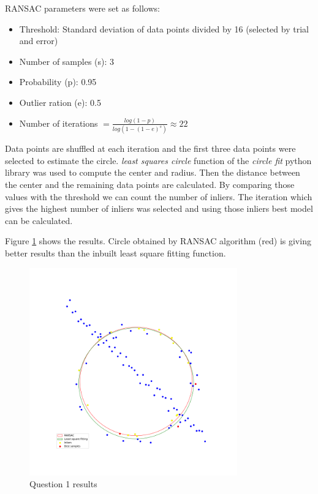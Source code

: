 \documentclass[11pt]{article}
\begin{document}
\noindent RANSAC parameters were set as follows:
\begin{itemize}
    \item Threshold: Standard deviation of data points divided by 16 (selected by trial and error)
    \item Number of samples (s): 3
    \item Probability (p): 0.95
    \item Outlier ration (e): 0.5
    \item Number of iterations $ = \frac{log(1-p)}{log(1-(1-e)^s)} \approx 22 $
\end{itemize}

\noindent Data points are shuffled at each iteration and the first three data points were selected to estimate the circle. \textit{least squares circle} 
function of the \textit{circle fit} python library was used to compute the center and radius. Then the distance between the center and the remaining 
data points are calculated. By comparing those values with the threshold we can count the number of inliers. The iteration which gives the highest
number of inliers was selected and using those inliers best model can be calculated. 

\noindent Figure \ref{RANSAC} shows the results. Circle obtained by RANSAC algorithm (red) is giving better 
results than the inbuilt least square fitting function. \\

\begin{figure}[!h]
    \centering
    \includegraphics[width=0.8\textwidth]{Images/1.png}
    \caption{Question 1 results}
    \label{RANSAC}
\end{figure}
\end{document}
